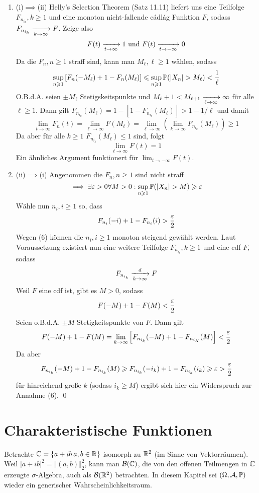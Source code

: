 \documentclass[11pt]{report}
\begin{document}
\begin{enumerate}[label=\Roman*.]
    \item (i)$\implies$(ii)\newline
    Helly's Selection Theorem (Satz 11.11) liefert uns eine Teilfolge $F_{n_{i_k}},k\geq1$ und eine monoton nicht-fallende cádlág Funktion $F$, sodass $F_{n_{i_k}}\nto{}{k\to\infty}F$. Zeige also 
    $$F(t)\nto{}{t\to\infty}1\text{ und }F(t)\nto{}{t\to-\infty}0$$
    Da die $F_n,n\geq1$ straff sind, kann man $M_\ell,\ell\geq1$ w\"ahlen, sodass
    $$\sup_{n\geq1}\left[F_n(-M_\ell)+1-F_n(M_\ell)\right]\leq\sup_{n\geq1}\Pp(|X_n|>M_\ell)<\dfrac{1}{\ell}$$
    O.B.d.A. seien $\pm M_\ell$ Stetigskeitspunkte und $M_\ell+1<M_{\ell+1}\nto{}{\ell\to\infty}\infty$ f\"ur alle $\ell\geq1$. Dann gilt $F_{n_{i_k}}(M_\ell)=1-[1-F_{n_{i_k}}(M_\ell)]>1-1/\ell$
    und damit
    $$\lim_{t\to\infty}F_n(t)=\lim_{\ell\to\infty}F(M_\ell)=\lim_{\ell\to\infty}\left(\lim_{k\to\infty}F_{n_{i_k}}(M_\ell)\right)\geq1$$
    Da aber f\"ur alle $k\geq1$ $F_{n_{i_k}}(M_\ell)\leq1$ sind, folgt
    $$\lim_{t\to\infty}F(t)=1$$
    Ein \"ahnliches Argument funktionert f\"ur $\lim_{t\to-\infty}F(t)$.
    \item (ii)$\implies$(i)\newline
    Angenommen die $F_n,n\geq1$ sind nicht straff
    \begin{equation}
        \implies\exists\eps>0\forall M>0:\sup_{n\geq1}\Pp(|X_n|>M)\geq\eps
    \end{equation}
    W\"ahle nun $n_i,i\geq1$ so, dass
    $$F_{n_i}(-i)+1-F_{n_i}(i)>\dfrac{\varepsilon}{2}$$
    Wegen (6) k\"onnen die $n_i,i\geq1$ monoton steigend gew\"ahlt werden. Laut Voraussetzung existiert nun eine weitere Teilfolge $F_{n_{i_k}},k\geq1$ und eine cdf $F$, sodass
    $$F_{n_{i_k}}\nto{d}{k\to\infty}F$$
    Weil $F$ eine cdf ist, gibt es $M>0$, sodass
    $$F(-M)+1-F(M)<\dfrac{\varepsilon}{2}$$
    Seien o.B.d.A. $\pm M$ Stetigkeitspunkte von $F$. Dann gilt
    $$F(-M)+1-F(M)=\lim_{k\to\infty}\left[F_{n_{i_k}}(-M)+1-F_{n_{i_K}}(M)\right]<\dfrac{\varepsilon}{2}$$
    Da aber 
    $$F_{n_{i_k}}(-M)+1-F_{n_{i_k}}(M)\geqslant F_{n_{i_k}}(-i_k)+1-F_{n_{i_k}}(i_k)\geqslant\varepsilon>\dfrac{\varepsilon}{2}$$
    f\"ur hinreichend gro\ss{}e $k$ (sodass $i_k\geq M$) ergibt sich hier ein Widerspruch zur Annahme (6). \qed
\end{enumerate}

\section*{Charakteristische Funktionen}
Betrachte $\mathbb{C}=\{a+ib\:a,b\in\mathbb{R}\}$ isomorph zu $\mathbb{R}^2$ (im Sinne von Vektorr\"aumen). Weil $|a+ib|^2=\Vert(a,b)\Vert_2^2$, kann man $\mathcal{B}(\mathbb{C})$, die von den offenen Teilmengen in $\mathbb{C}$ erzeugte $\sigma$-Algebra, auch als $\mathcal{B}(\mathbb{R}^2)$ betrachten. In diesem Kapitel sei $(\Omega, \mathcal{A}, \mathbb{P})$ wieder ein generischer Wahrscheinlichkeitsraum.
\end{document}
